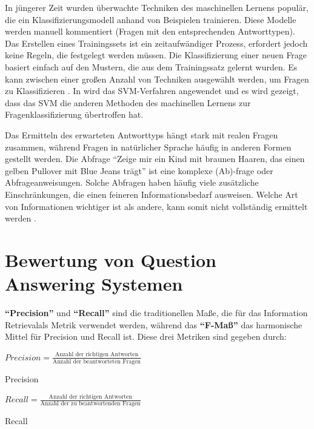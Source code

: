 \documentclass[
        ngerman,
        paper=a4,
        numbers=noendperiod,
]{scrreprt}
\begin{document}
In jüngerer Zeit wurden überwachte Techniken des maschinellen Lernens populär, die ein Klassifizierungsmodell anhand von Beispielen trainieren. Diese Modelle werden manuell kommentiert (Fragen mit den entsprechenden Antworttypen). Das Erstellen eines Trainingssets ist ein zeitaufwändiger Prozess, erfordert jedoch keine Regeln, die festgelegt werden müssen. Die Klassifizierung einer neuen Frage basiert einfach auf den Mustern, die aus dem Trainingssatz gelernt wurden. Es kann zwischen einer großen Anzahl von Techniken ausgewählt werden, um Fragen zu Klassifizieren \citep[S. 5421]{Kolomiyets2011APerspective}. In \citep{zhang2003question} wird das SVM-Verfahren angewendet und es wird gezeigt, dass das SVM die anderen Methoden des machinellen Lernens zur Fragenklassifizierung übertroffen hat.

Das Ermitteln des erwarteten Antworttyps hängt stark mit realen Fragen zusammen, während Fragen in natürlicher Sprache häufig in anderen Formen gestellt werden. Die Abfrage \enquote{Zeige mir ein Kind mit braunen Haaren, das einen gelben Pullover mit Blue Jeans trägt} ist eine komplexe (Ab)-frage oder Abfrageanweisungen. Solche Abfragen   haben häufig viele zusätzliche Einschränkungen, die einen feineren Informationsbedarf ausweisen. Welche Art von Informationen wichtiger ist als andere, kann somit nicht vollständig ermittelt werden \citep[S. 5422]{Kolomiyets2011APerspective}. 


\section{Bewertung von Question Answering Systemen}
\textbf{\enquote{Precision}} und \textbf{\enquote{Recall}} sind die traditionellen Maße, die für das Information Retrievalals Metrik verwendet werden, während das \textbf{\enquote{F-Maß}} das harmonische Mittel für Precision und Recall ist. Diese drei Metriken sind gegeben durch:

\begin{xequation-} 
\centering ${Precision}= \frac{\text{Anzahl der richtigen Antworten}}{\text{Anzahl der beantworteten Fragen}}$
\caption[Precision]{Precision} 
    \label{eqn:PRE}
\end{xequation-} 

\begin{xequation-} 
\centering ${Recall}= \frac{\text{Anzahl der richtigen Antworten}}{\text{Anzahl der zu beantwortenden Fragen}}$
\caption[Recall]{Recall} 
    \label{eqn:REC}
\end{xequation-} 
\end{document}
